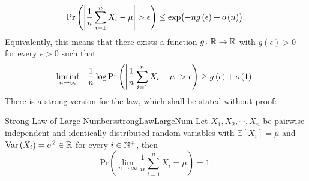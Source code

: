 \documentclass[math]{amznotes}
\theoremstyle{remark}
\begin{document}
\begin{equation*}
    \mathrm{Pr}\left({\left\lvert {\frac{1}{n}\sum_{i = 1}^nX_i - \mu} \right\rvert} > \epsilon\right) \leq \exp\bigl(-ng\left(\epsilon\right) + o\left(n\right)\bigr).
\end{equation*}
Equivalently, this means that there exists a function $g \colon \mathbb{R} \to \mathbb{R}$ with $g\left(\epsilon\right) > 0$ for every $\epsilon > 0$ such that 
\begin{equation*}
    \liminf_{n \to \infty}-\frac{1}{n}\log\mathrm{Pr}\left({\left\lvert {\frac{1}{n}\sum_{i = 1}^nX_i - \mu} \right\rvert} > \epsilon\right) \geq g\left(\epsilon\right) + o\left(1\right).
\end{equation*}
There is a strong version for the law, which shall be stated without proof:
\begin{thmbox}{Strong Law of Large Numbers}{strongLawLargeNum}
    Let $X_1, X_2, \cdots, X_n$ be pairwise independent and identically distributed random variables with $\mathbb{E}[X_i] = \mu$ and $\mathrm{Var}\left(X_i\right) = \sigma^2 \in \mathbb{R}$ for every $i \in \mathbb{N}^+$, then 
    \begin{equation*}
        \mathrm{Pr}\left(\lim_{n \to \infty}\frac{1}{n}\sum_{i = 1}^{n}X_i = \mu\right) = 1.
    \end{equation*}
\end{thmbox}
\end{document}

